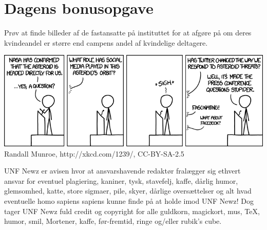 \begin{minipage}[b]{0.95\linewidth}
\begin{minipage}[t]{0.47\textwidth}
\section*{Dagens bonusopgave}
Prøv at finde billeder af de fastansatte på instituttet for at afgøre på om deres kvindeandel er større end campens andel af kvindelige deltagere.

\end{minipage}

\begin{center}
\includegraphics[width=\linewidth]{social_media.png}
\tiny Randall Munroe, http://xkcd.com/1239/, CC-BY-SA-2.5

\tiny UNF Newz er avisen hvor at ansvarshavende redaktør fralægger sig ethvert ansvar for eventuel plagiering, kaniner, tysk, stavefelj, kaffe, dårlig humor, glemsomhed, katte, store sigmaer, pile, skyer, dårlige oversættelser og alt hvad eventuelle homo sapiens sapiens kunne finde på at holde imod UNF Newz! Dog tager UNF Newz fuld credit og copyright for alle guldkorn, magickort, mus, \TeX, humor, smil, Mortener, kaffe, før-fremtid, ringe og/eller rubik's cube.
\end{center}
\end{minipage}

